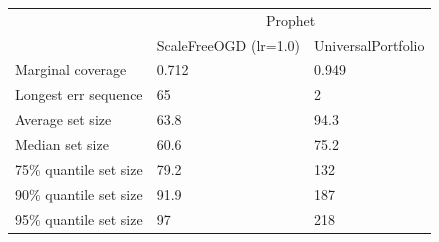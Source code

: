 \begin{tabular}{lll}
\toprule
& \multicolumn{2}{c}{Prophet} \\
& ScaleFreeOGD (lr=1.0) & UniversalPortfolio \\
\midrule
Marginal coverage & 0.712 & 0.949 \\
Longest err sequence & 65 & 2 \\
Average set size & 63.8 & 94.3 \\
Median set size & 60.6 & 75.2 \\
75\% quantile set size & 79.2 & 132 \\
90\% quantile set size & 91.9 & 187 \\
95\% quantile set size & 97 & 218 \\
\bottomrule
\end{tabular}
